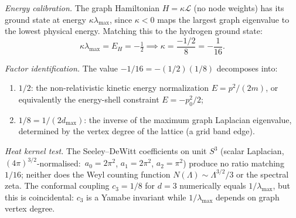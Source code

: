 \documentclass[aps,pra,twocolumn,superscriptaddress,longbibliography]{revtex4-2}
\begin{document}
\textit{Energy calibration.}  The graph Hamiltonian
$H = \kappa \mathcal{L}$ (no node weights) has its ground
state at energy $\kappa \lambda_{\max}$, since $\kappa < 0$
maps the largest graph eigenvalue to the lowest physical energy.
Matching this to the hydrogen ground state:
\begin{equation}
  \kappa \lambda_{\max} = E_H = -\tfrac{1}{2}
  \implies
  \kappa = \frac{-1/2}{8} = -\frac{1}{16}.
  \label{eq:kappa_derived}
\end{equation}

\textit{Factor identification.}  The value $-1/16 = -(1/2)(1/8)$
decomposes into:
\begin{enumerate}
  \item $1/2$: the non-relativistic kinetic energy normalization
    $E = p^2/(2m)$, or equivalently the energy-shell constraint
    $E = -p_0^2/2$;
  \item $1/8 = 1/(2 d_{\max})$: the inverse of the maximum
    graph Laplacian eigenvalue, determined by the vertex degree
    of the lattice (a grid band edge).
\end{enumerate}

\textit{Heat kernel test.}  The Seeley--DeWitt coefficients on unit
$S^3$ (scalar Laplacian, $(4\pi)^{3/2}$-normalised:\ $a_0 = 2\pi^2$, $a_1 = 2\pi^2$, $a_2 = \pi^2$) produce no
ratio matching $1/16$; neither does the Weyl counting function
$N(\Lambda) \sim \Lambda^{3/2}/3$ or the spectral zeta.  The conformal
coupling $c_3 = 1/8$ for $d=3$ numerically equals $1/\lambda_{\max}$,
but this is coincidental: $c_3$ is a Yamabe invariant while
$1/\lambda_{\max}$ depends on graph vertex degree.
\end{document}
